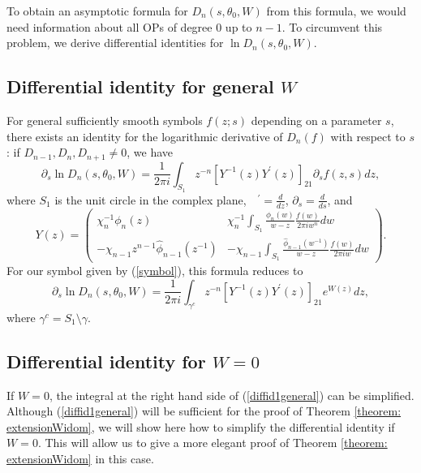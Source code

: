 \documentclass[11pt,fleqn]{article}
\numberwithin{equation}{section}
\begin{document}
To obtain an asymptotic formula for $D_{n}(s,\theta_0,W)$ from this formula, we would need information about all OPs of degree $0$ up to $n-1$. To circumvent this problem, we derive differential identities for $\ln D_{n}(s,\theta_0,W)$.

\subsection{Differential identity for general $W$}

For general sufficiently smooth symbols $f(z;s)$ depending on a parameter $s$, there exists an identity for the logarithmic derivative of $D_n(f)$ with respect to $s$: if $D_{n-1}, D_n, D_{n+1}\neq 0$, we have \cite[Proposition 3.3]{DeiftItsKrasovsky}
\begin{equation*}
\partial_{s} \ln D_{n} (s,\theta_{0},W) = \frac{1}{2\pi i} \int_{S_{1}} z^{-n} \left[ Y^{-1}(z) Y^{\prime}(z) \right]_{21} \partial_s f(z,s) dz,
\end{equation*}
where $S_1$ is the unit circle in the complex plane, $\mbox{ }^{\prime} = \frac{d}{dz}$, $ \partial_s = \frac{d}{ds}$, and
\begin{equation}\label{sol_Y}
Y(z) = \begin{pmatrix} \chi_{n}^{-1} \phi_{n}(z) & \displaystyle \chi_{n}^{-1} \int_{S_{1}} \frac{\phi_{n}(w)}{w-z} \frac{f(w)}{2\pi i w^{n}} dw \\
\displaystyle -\chi_{n-1} z^{n-1} \widehat{\phi}_{n-1}(z^{-1}) & \displaystyle -\chi_{n-1} \int_{S_{1}} \frac{\widehat{\phi}_{n-1}(w^{-1})}{w-z} \frac{f(w)}{2\pi i w} dw
\end{pmatrix}.
\end{equation}
For our symbol given by (\ref{symbol}), this formula reduces to
\begin{equation}\label{diffid1general}
\partial_{s} \ln D_{n} (s,\theta_{0},W) = \frac{1}{2\pi i} \int_{\gamma^{c}} z^{-n} \left[ Y^{-1}(z)Y^{\prime}(z) \right]_{21} e^{W(z)}dz,
\end{equation}
where $\gamma^{c} = S_{1}\setminus \gamma$.

\subsection{Differential identity for $W = 0$}

If $W=0$, the integral at the right hand side of (\ref{diffid1general}) can be simplified. Although (\ref{diffid1general}) will be sufficient for the proof of Theorem \ref{theorem: extensionWidom}, we will show here how to simplify the differential identity if $W=0$. This will allow us to give a more elegant proof of Theorem \ref{theorem: extensionWidom} in this case.
\end{document}
